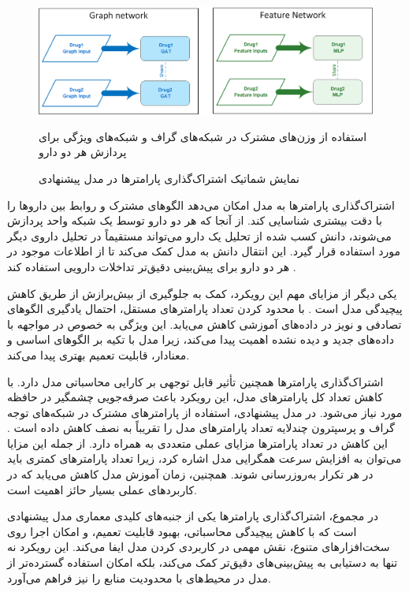 \begin{figure}[t]
	\centering
	\includegraphics[width=\textwidth]{images/param-sharing.png}
	\caption{نمایش شماتیک اشتراک‌گذاری پارامترها در مدل پیشنهادی} استفاده از وزن‌های مشترک در شبکه‌های گراف و شبکه‌های ویژگی برای پردازش هر دو دارو
	\label{fig:param_sharing}
\end{figure}

اشتراک‌گذاری پارامترها به مدل امکان می‌دهد الگوهای مشترک و روابط بین داروها را با دقت بیشتری شناسایی کند. از آنجا که هر دو دارو توسط یک شبکه واحد پردازش می‌شوند، دانش کسب شده از تحلیل یک دارو می‌تواند مستقیماً در تحلیل داروی دیگر مورد استفاده قرار گیرد. این انتقال دانش به مدل کمک می‌کند تا از اطلاعات موجود در هر دو دارو برای پیش‌بینی دقیق‌تر تداخلات دارویی استفاده کند \cite{ref_deng2020}.

یکی دیگر از مزایای مهم این رویکرد، کمک به جلوگیری از بیش‌برازش از طریق کاهش پیچیدگی مدل است \cite{ref_xu2019}. با محدود کردن تعداد پارامترهای مستقل، احتمال یادگیری الگوهای تصادفی و نویز در داده‌های آموزشی کاهش می‌یابد. این ویژگی به خصوص در مواجهه با داده‌های جدید و دیده نشده اهمیت پیدا می‌کند، زیرا مدل با تکیه بر الگوهای اساسی و معنادار، قابلیت تعمیم بهتری پیدا می‌کند.

اشتراک‌گذاری پارامترها همچنین تأثیر قابل توجهی بر کارایی محاسباتی مدل دارد. با کاهش تعداد کل پارامترهای مدل، این رویکرد باعث صرفه‌جویی چشمگیر در حافظه مورد نیاز می‌شود. در مدل پیشنهادی، استفاده از پارامترهای مشترک در شبکه‌های توجه گراف و پرسپترون چندلایه تعداد پارامترهای مدل را تقریباً به نصف کاهش داده است \cite{ref_dai2020}. این کاهش در تعداد پارامترها مزایای عملی متعددی به همراه دارد. از جمله این مزایا می‌توان به افزایش سرعت همگرایی مدل اشاره کرد، زیرا تعداد پارامترهای کمتری باید در هر تکرار به‌روزرسانی شوند. همچنین، زمان آموزش مدل کاهش می‌یابد که در کاربردهای عملی بسیار حائز اهمیت است.

در مجموع، اشتراک‌گذاری پارامترها یکی از جنبه‌های کلیدی معماری مدل پیشنهادی است که با کاهش پیچیدگی محاسباتی، بهبود قابلیت تعمیم، و امکان اجرا روی سخت‌افزارهای متنوع، نقش مهمی در کاربردی کردن مدل ایفا می‌کند. این رویکرد نه تنها به دستیابی به پیش‌بینی‌های دقیق‌تر کمک می‌کند، بلکه امکان استفاده گسترده‌تر از مدل در محیط‌های با محدودیت منابع را نیز فراهم می‌آورد.

